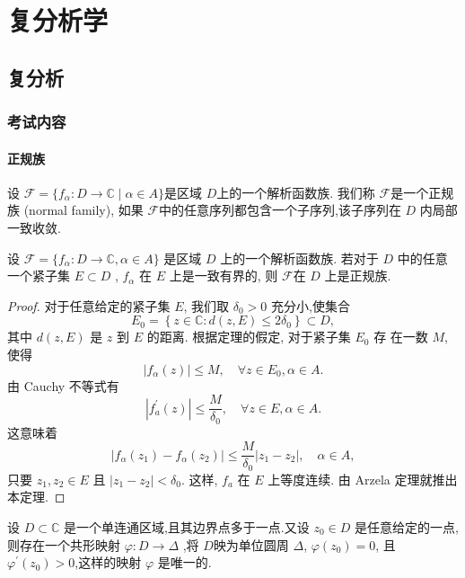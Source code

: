 \part{复分析学}
\chapter{复分析}
\section{考试内容}
\subsection{正规族}
\begin{defi}[正规族]\label{def: normal family}
    设 $\mathscr{F}=\{f_\alpha \colon D\to \mathbb{C}\mid \alpha \in A\}$是区域 $D$上的一个解析函数族. 我们称 $\mathscr{F}$是一个正规族 (normal family), 如果 $\mathscr{F}$中的任意序列都包含一个子序列,该子序列在 $D$ 内局部一致收敛.
\end{defi}
\begin{thm}[Montel 定理]\label{thm: Montel thm}
    设 $\mathscr{F}=\{f_\alpha \colon D\to \mathbb
    {C} ,\alpha\in A\}$ 是区域 $D$ 上的一个解析函数族. 若对于 $D$ 中的任意一个紧子集 $E\subset D$ , $f_\alpha$ 在 $E$ 上是一致有界的, 则 $\mathscr{F}$在 $D$ 上是正规族.
\end{thm}
\begin{proof}
    对于任意给定的紧子集 $E$, 我们取 $\delta_0>0$ 充分小,使集合
$$
E_0=\left\{z \in \mathbb{C}: d(z, E) \leqslant 2 \delta_0\right\} \subset D,
$$
其中 $d(z, E)$ 是 $z$ 到 $E$ 的距离. 根据定理的假定, 对于紧子集 $E_0$ 存 在一数 $M$,使得
$$
\left|f_\alpha(z)\right| \leqslant M, \quad \forall z \in E_0, \alpha \in A .
$$
由 Cauchy 不等式有
$$
\left|f_a^{\prime}(z)\right| \leqslant \frac{M}{\delta_0}, \quad \forall z \in E, \alpha \in A .
$$
这意味着
$$
\left|f_\alpha\left(z_1\right)-f_\alpha\left(z_2\right)\right| \leqslant \frac{M}{\delta_0}\left|z_1-z_2\right|, \quad \alpha \in A,
$$
只要 $z_1, z_2 \in E$ 且 $\left|z_1-z_2\right|<\delta_0$. 这样, $f_a$ 在 $E$ 上等度连续. 由 Arzela 定理就推出本定理. 
\end{proof}
\begin{thm}\label{thm: Riemann map theorem}
    设 $D\subset \mathbb
    {C}$ 是一个单连通区域,且其边界点多于一点.又设 $z_0\in D$ 是任意给定的一点,则存在一个共形映射 $\varphi : D\to \Delta$ ,将 $D$映为单位圆周 $\Delta$, $\varphi(z_0)=0$,
    且 $\varphi^\prime (z_0)>0$,这样的映射 $\varphi$ 是唯一的.
\end{thm}
